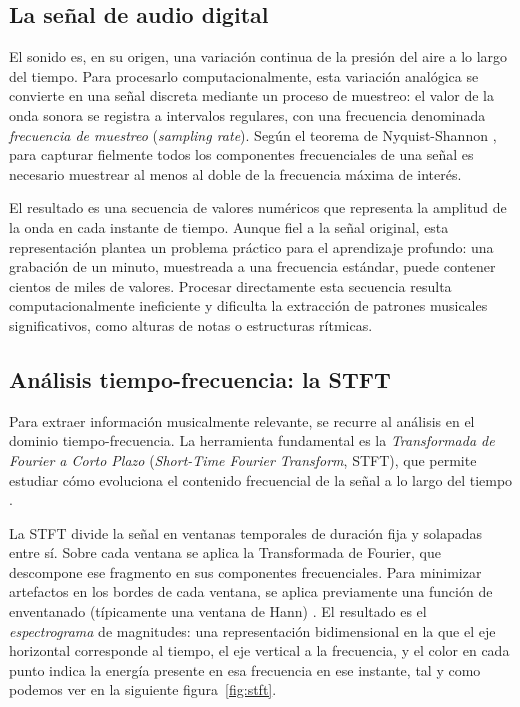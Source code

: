 \subsection{La señal de audio digital}

El sonido es, en su origen, una variación continua de la presión del
aire a lo largo del tiempo. Para procesarlo computacionalmente, esta
variación analógica se convierte en una señal discreta mediante un
proceso de muestreo: el valor de la onda sonora se registra a intervalos
regulares, con una frecuencia denominada \textit{frecuencia de muestreo}
(\textit{sampling rate}). Según el teorema de Nyquist-Shannon
\cite{shannon1949communication}, para capturar fielmente todos los
componentes frecuenciales de una señal es necesario muestrear al menos
al doble de la frecuencia máxima de interés.

El resultado es una secuencia de valores numéricos que representa la
amplitud de la onda en cada instante de tiempo. Aunque fiel a la señal
original, esta representación plantea un problema práctico para el
aprendizaje profundo: una grabación de un minuto, muestreada a una
frecuencia estándar, puede contener cientos de miles de valores. Procesar
directamente esta secuencia resulta computacionalmente ineficiente y
dificulta la extracción de patrones musicales significativos, como alturas
de notas o estructuras rítmicas.

\subsection{Análisis tiempo-frecuencia: la STFT}

Para extraer información musicalmente relevante, se recurre al análisis
en el dominio tiempo-frecuencia. La herramienta fundamental es la
\textit{Transformada de Fourier a Corto Plazo} (\textit{Short-Time
Fourier Transform}, STFT), que permite estudiar cómo evoluciona el
contenido frecuencial de la señal a lo largo del tiempo
\cite{muller2021fundamentals}.

La STFT divide la señal en ventanas temporales de duración fija y
solapadas entre sí. Sobre cada ventana se aplica la Transformada de
Fourier, que descompone ese fragmento en sus componentes frecuenciales.
Para minimizar artefactos en los bordes de cada ventana, se aplica
previamente una función de enventanado (típicamente una ventana de
Hann) \cite{harris1978use}. El resultado es el \textit{espectrograma}
de magnitudes: una representación bidimensional en la que el eje
horizontal corresponde al tiempo, el eje vertical a la frecuencia, y el
color en cada punto indica la energía presente en esa frecuencia
en ese instante, tal y como podemos ver en la siguiente figura~\ref{fig:stft}.

